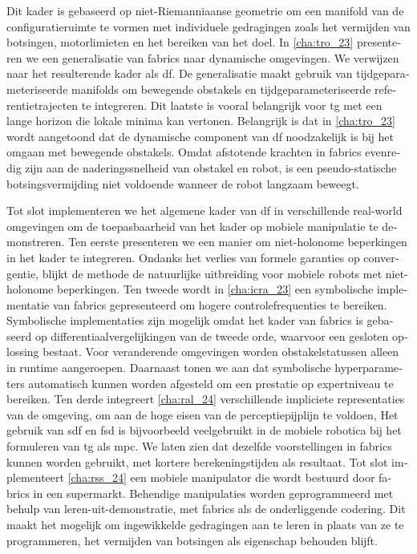 \begin{otherlanguage}{dutch}
Dit kader is gebaseerd op niet-Riemanniaanse geometrie om een manifold
van de configuratieruimte te vormen met individuele gedragingen zoals
het vermijden van botsingen, motorlimieten en het bereiken van het doel.
In \cref{cha:tro_23}
presenteren we een generalisatie van \ac{fabrics} naar dynamische omgevingen. We
verwijzen naar het resulterende kader als \ac{df}. De generalisatie maakt
gebruik van tijdgeparameteriseerde manifolds
om bewegende obstakels en
tijdgeparameteriseerde referentietrajecten te integreren. Dit laatste is vooral
belangrijk voor \ac{tg} met een lange horizon die lokale minima kan vertonen.
Belangrijk is dat in \cref{cha:tro_23} wordt aangetoond dat de dynamische
component van \ac{df} noodzakelijk is bij het omgaan met bewegende obstakels.
Omdat afstotende krachten in \ac{fabrics} evenredig zijn aan de
naderingssnelheid van obstakel en robot, is een pseudo-statische
botsingsvermijding niet voldoende wanneer de robot langzaam beweegt.

Tot slot implementeren we het algemene kader van \ac{df} in verschillende
real-world omgevingen om de toepasbaarheid van het kader op mobiele manipulatie
te demonstreren. Ten eerste presenteren we een manier om niet-holonome
beperkingen in het kader te integreren. Ondanks het verlies van formele
garanties op convergentie, blijkt de methode de natuurlijke uitbreiding voor
mobiele robots met niet-holonome beperkingen. Ten tweede wordt in
\cref{cha:icra_23} een symbolische implementatie van \ac{fabrics} gepresenteerd
om hogere controlefrequenties te bereiken. Symbolische implementaties zijn
mogelijk omdat het kader van \ac{fabrics} is gebaseerd op
differentiaalvergelijkingen van de tweede orde, waarvoor een gesloten oplossing
bestaat. Voor veranderende omgevingen worden obstakelstatussen alleen in runtime
aangeroepen. Daarnaast tonen we aan dat symbolische hyperparameters
automatisch kunnen worden afgesteld om een prestatie op expertniveau te
bereiken. Ten derde integreert \cref{cha:ral_24} verschillende impliciete representaties van de omgeving, om aan de hoge eisen van de
perceptiepijplijn te voldoen,
Het gebruik van \ac{sdf} en \ac{fsd} is bijvoorbeeld
veelgebruikt in de mobiele robotica bij het formuleren van \ac{tg} als \ac{mpc}.
We laten zien dat dezelfde voorstellingen in \ac{fabrics} kunnen worden
gebruikt, met kortere berekeningstijden als resultaat. Tot slot implementeert
\cref{cha:rss_24} een mobiele manipulator die wordt bestuurd door \ac{fabrics}
in een supermarkt. Behendige manipulaties worden geprogrammeerd met behulp van
leren-uit-demonstratie, met \ac{fabrics} als de onderliggende codering. Dit
maakt het mogelijk om ingewikkelde gedragingen aan te leren in plaats van ze te
programmeren, het vermijden van botsingen als eigenschap behouden blijft.


\end{otherlanguage}
